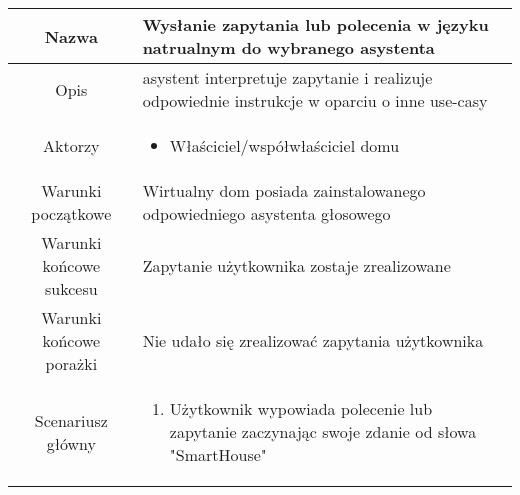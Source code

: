 \documentclass{article}
\begin{document}
\begin{enumerate}
\begin{enumerate}
				\begin{table}[H]
					\centering
					\begin{tabular}{|c|p{7cm}|}
						\hline
						Nazwa                   & \textbf{Wysłanie zapytania lub polecenia w języku natrualnym do wybranego asystenta}                                                                                                                                                                                                                                                     \\
						\hline
						Opis                    & asystent interpretuje zapytanie i realizuje odpowiednie instrukcje w oparciu o inne use-casy                                                                                                                                                                                                                                             \\
						\hline
						Aktorzy                 & \begin{itemize}\item Właściciel/współwłaściciel domu\end{itemize}                                                                                                                                                                                                                                                                        \\
						\hline
						Warunki początkowe      & Wirtualny dom posiada zainstalowanego odpowiedniego asystenta głosowego                                                                                                                                                                                                                                                                  \\
						\hline
						Warunki końcowe sukcesu & Zapytanie użytkownika zostaje zrealizowane                                                                                                                                                                                                                                                                                               \\
						\hline
						Warunki końcowe porażki & Nie udało się zrealizować zapytania użytkownika                                                                                                                                                                                                                                                                                          \\
						\hline
						Scenariusz główny       & \begin{enumerate}\item Użytkownik wypowiada polecenie lub zapytanie zaczynając swoje zdanie od słowa "SmartHouse"


\end{enumerate}
\end{tabular}
\end{table}
\end{enumerate}
\end{enumerate}
\end{document}
